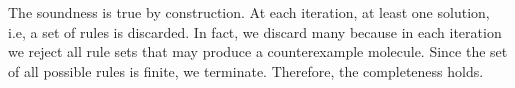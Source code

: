The soundness is true by construction.
At each iteration, at least one solution, i.e,
a set of rules is discarded.
In fact, we discard many because in each iteration we reject all rule sets that may produce a counterexample molecule. 
Since the set of all possible rules is finite, we terminate.
Therefore, the completeness holds.





